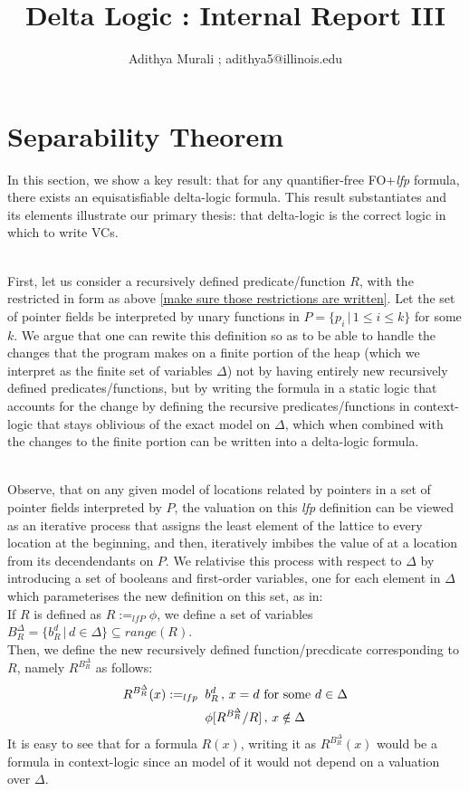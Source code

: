 \documentclass[12pt]{article} %
\begin{document}
\title{Delta Logic : Internal Report III}
\author{Adithya Murali ; adithya5@illinois.edu}
\maketitle


	\section{Separability Theorem}
In this section, we show a key result: that for any quantifier-free FO+\textit{lfp} formula, there exists an equisatisfiable delta-logic formula. This result substantiates and its elements illustrate our primary thesis: that delta-logic is the correct logic in which to write VCs.\\\

First, let us consider a recursively defined predicate/function $R$, with the restricted in form as above \ref{make sure those restrictions are written}. Let the set of pointer fields be interpreted by unary functions in $P = \{ p_i \,|\, 1 \leq{} i \leq{} k \}$ for some $k$. We argue that one can rewite this definition so as to be able to handle the changes that the program makes on a finite portion of the heap (which we interpret as the finite set of variables $\Delta{}$) not by having entirely new recursively defined predicates/functions, but by writing the formula in a static logic that accounts for the change by defining the recursive predicates/functions in context-logic that stays oblivious of the exact model on $\Delta{}$, which when combined with the changes to the finite portion can be written into a delta-logic formula.\\\

Observe, that on any given model of locations related by pointers in a set of pointer fields interpreted by $P$, the valuation on this \textit{lfp} definition can be viewed as an iterative process that assigns the least element of the lattice to every location at the beginning, and then, iteratively imbibes the value of at a location from its decendendants on $P$. We relativise this process with respect to $\Delta$ by introducing a set of booleans and first-order variables, one for each element in $\Delta$ which parameterises the new definition on this set, as in:\\
If $R$ is defined as $R :=_{lfP} \phi{}$, we define a set of variables $B_{R}^{\Delta} = \{b_{R}^{d}\,|\, d \in{} \Delta{} \} \subseteq{} range(R)$.\\
 Then, we define the new recursively defined function/precdicate corresponding to $R$, namely $R^{B_{R}^{\Delta}}$ as follows:\\
\begin{align}
R^{B_{R}^{\Delta}}(x) :=_{lfp} &\;\; b_{R}^{d}\,,\, x = d \textrm{ for some } d \in{}\Delta{}\notag{}\\
&\;\; \phi{}[R^{B_{R}^{\Delta}}/R] \,,\, x \notin{} \Delta{} \notag{}
\end{align}  
It is easy to see that for a formula $R(x)$, writing it as $R^{B_{R}^{\Delta}}(x)$ would be a formula in context-logic since an model of it would not depend on a valuation over $\Delta{}$.\\\
\end{document}
